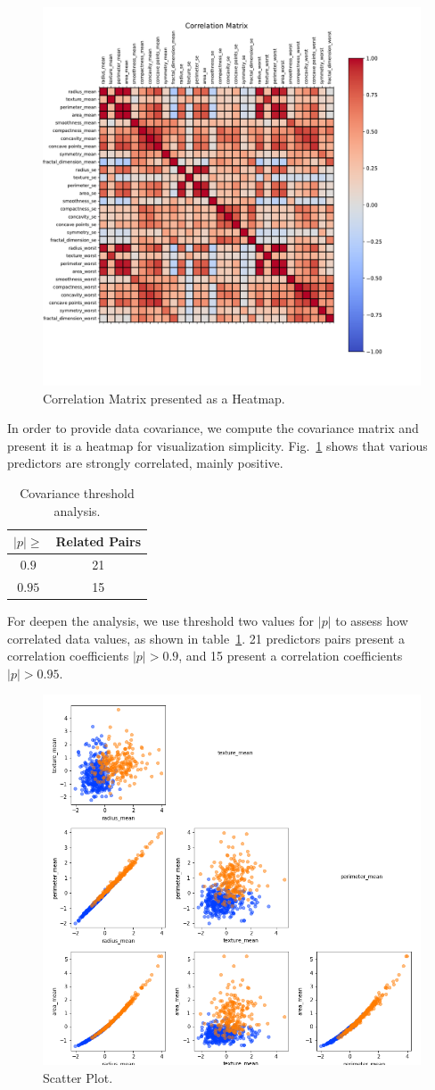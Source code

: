 \documentclass[conference]{IEEEtran}
\begin{document}
\begin{figure}[htbp!]
    \centerline{\includegraphics[width=0.5 \textwidth]{../../code/hw1/figures/4-3-correlation.pdf}}
    \caption{Correlation Matrix presented as a Heatmap.}
    \label{fig:4-3-correlation}
\end{figure}

In order to provide data covariance, we compute the covariance matrix and present it is a heatmap for visualization simplicity. Fig.~\ref{fig:4-3-correlation} shows that various predictors are strongly correlated, mainly positive.

\begin{table}[htbp]
\caption{Covariance threshold analysis.}
\begin{center}
\begin{tabular}{|c|c|}
        \hline 
        $|p| \geq$ & Related Pairs\\
        \hline
        $0.9$ & 21\\
        \hline
        $0.95$ & 15 \\
        \hline
\end{tabular}
\label{tab:Covariance}
\end{center}
\end{table}

For deepen the analysis, we use threshold two values for $|p|$ to assess how correlated data values, as shown in table~\ref{tab:Covariance}. 21 predictors pairs present a correlation coefficients $|p| > 0.9$, and 15 present a correlation coefficients $|p| > 0.95$.

\begin{figure}[htbp!]
    \centerline{\includegraphics[width=0.5 \textwidth]{../../code/hw1/figures/4-1-scatter-plot-clip.png}}
    \caption{Scatter Plot.}
    \label{fig:4-1-scatter-plot}
\end{figure}
\end{document}
